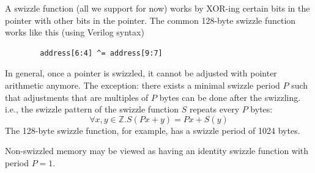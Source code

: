 
A  swizzle function (all we support for now) works by XOR-ing certain bits in the pointer with other bits in the pointer.
The common 128-byte swizzle function works like this (using Verilog syntax)
\begin{verbatim}
        address[6:4] ^= address[9:7]
\end{verbatim}

In general, once a pointer is swizzled, it cannot be adjusted with pointer arithmetic anymore.
The exception: there exists a minimal swizzle period $P$ such that adjustments that are multiples of $P$ bytes can be done after the swizzling.
i.e., the swizzle pattern of the swizzle function $S$ repeats every $P$ bytes:
\begin{equation*}
    \forall x, y \in \mathbb{Z}. S(Px + y) = Px + S(y)
\end{equation*}
The 128-byte swizzle function, for example, has a swizzle period of 1024 bytes.

Non-swizzled memory may be viewed as having an identity swizzle function with period $P = 1$.
